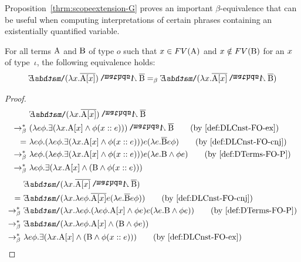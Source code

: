 Proposition~\ref{thrm:scopeextension-G}  proves an important $\beta$-equivalence that can be useful when computing interpretations of certain phrases containing an existentially quantified variable.
\begin{proposition} For all terms $\A1$ and $\B1$ of type $o$ such that  $\x1 \in FV(\A1)$ and $\x1 \notin FV(\B1)$ for an $\x1$ of type~$\iota$, the following equivalence holds: \label{thrm:scopeextension-G}
\begin{align*}
  {\ex2} (\lambda \x1.  \tr{\A1[\x1]}) \cnj2 \tr{\B1}  =_{\beta}  \ex2 (\lambda \x1.  \tr{\A1[\x1]}  \cnj2  \tr{\B1} ) 
\end{align*} 
\end{proposition}
%
\begin{proof}
%
\begin{align}
 &  {\ex2} (\lambda \x1.  \tr{\A1[\x1]}) \cnj2 \tr{\B1}  \notag \\ 
 \bred \  &  ( \lambda e \phi.  \exists ( \lambda \x1. \A1[\x1] \land \phi (x::e) ) )  \cnj2  \tr{\B1}  \tag{by~\eqref{def:DLCnst-FO-ex}}\\
= \ &  \lambda e \phi. ( \lambda e \phi.  \exists ( \lambda \x1. \A1[\x1] \land \phi (x::e) ) ) e ( \lambda e. \tr{\B1} e \phi  ) \tag{by~\eqref{def:DLCnst-FO-cnj}} \\
\bred \ &   \lambda e \phi. ( \lambda e \phi.  \exists ( \lambda \x1. \A1[\x1] \land \phi (x::e) ) ) e ( \lambda e. \B1 \land  \phi e  )  \tag{by~\eqref{def:DTerms-FO-P}}\\
\bred \ &   \lambda e \phi.  \exists ( \lambda \x1. \A1[\x1] \land  (  \B1 \land  \phi  (x::e)  ) ) \label{eq:DLGexscope1}
\end{align}
%
\begin{align}
 &  \ex2 (\lambda \x1.  \tr{\A1[\x1]}  \cnj2  \tr{\B1} ) \notag \\
  = \ &    \ex2 (\lambda \x1.  \lambda e \phi. \tr{\A1[\x1]}  e (\lambda e. \tr{\B1}  e \phi)  ) \tag{by~\eqref{def:DLCnst-FO-cnj}} \\
  \bred \ &  \ex2 (\lambda \x1.  \lambda e \phi. (\lambda e \phi. \A1[\x1] \land \phi e ) e (\lambda e. \B1 \land  \phi e)  ) \tag{by~\eqref{def:DTerms-FO-P}}\\
    \bred \ &   \ex2 (\lambda \x1.  \lambda e \phi. \A1[\x1] \land  (\B1 \land  \phi e )   ) \\
\bred \ &   \lambda e \phi.  \exists ( \lambda \x1.   \A1[\x1] \land  (  \B1 \land  \phi ( \x1:: e ) ) ) \tag{by~\eqref{def:DLCnst-FO-ex}}
\end{align}
%
\end{proof}

